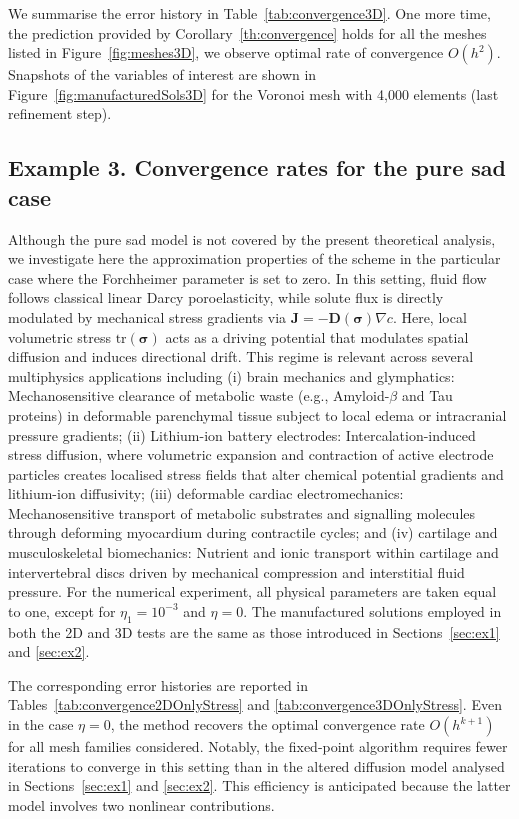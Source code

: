 \documentclass[fleqn,a4paper]{cas-sc}
\newcommand{\0}{\boldsymbol{0}}
\numberwithin{equation}{section}
\numberwithin{figure}{section}
\begin{document}
We summarise the error history in Table~\ref{tab:convergence3D}. One more time, the prediction provided by Corollary~\ref{th:convergence} holds for all the meshes listed in Figure~\ref{fig:meshes3D}, we observe optimal rate of convergence $O(h^2)$. Snapshots of the variables of interest are shown in Figure~\ref{fig:manufacturedSols3D} for the Voronoi mesh with 4,000 elements (last refinement step).

\subsection{Example 3. Convergence rates for the pure \gls{sad} case} \label{ex3}
Although the pure \gls{sad} model is not covered by the present theoretical analysis, we investigate here the approximation properties of the scheme in the particular case where the Forchheimer parameter is set to zero. {In this setting, fluid flow follows classical linear Darcy poroelasticity, while solute flux is directly modulated by mechanical stress gradients via $\mathbf{J} = -\mathbf{D}(\boldsymbol{\sigma})\nabla c$. Here, local volumetric stress $\text{tr}(\boldsymbol{\sigma})$ acts as a driving potential that modulates spatial diffusion and induces directional drift. This regime is relevant across several multiphysics applications including 
(i) brain mechanics and glymphatics: Mechanosensitive clearance of metabolic waste (e.g., Amyloid-$\beta$ and Tau proteins) in deformable parenchymal tissue subject to local edema or intracranial pressure gradients; 
(ii) Lithium-ion battery electrodes: Intercalation-induced stress diffusion, where volumetric expansion and contraction of active electrode particles creates localised stress fields that alter chemical potential gradients and lithium-ion diffusivity; 
(iii) deformable cardiac electromechanics: Mechanosensitive transport of metabolic substrates and signalling molecules through deforming myocardium during contractile cycles; and 
(iv) cartilage and musculoskeletal biomechanics: Nutrient and ionic transport within cartilage and intervertebral discs driven by mechanical compression and interstitial fluid pressure.}
 For the numerical experiment, all physical parameters are taken equal to one, except for $\eta_1=10^{-3}$ and $\eta=0$. The manufactured solutions employed in both the 2D and 3D tests are the same as those introduced in Sections~\ref{sec:ex1} and \ref{sec:ex2}.

The corresponding error histories are reported in Tables~\ref{tab:convergence2DOnlyStress} and \ref{tab:convergence3DOnlyStress}. Even in the case $\eta=0$, the method recovers the optimal convergence rate $O(h^{k+1})$ for all mesh families considered. {Notably, the fixed-point algorithm requires fewer iterations to converge in this setting than in the altered diffusion model analysed in Sections~\ref{sec:ex1} and \ref{sec:ex2}. This efficiency is anticipated because the latter model involves two nonlinear contributions.}
\end{document}
